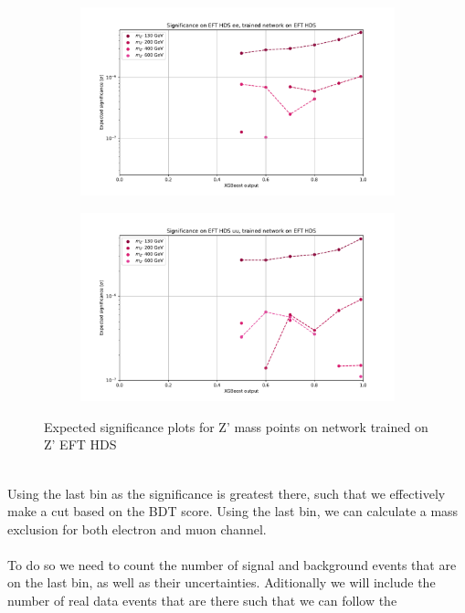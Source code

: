 \documentclass[14pt, a4paper]{book}
\begin{document}
\begin{figure}[!ht]
	\centering
	\begin{subfigure}[b]{0.49\textwidth}
      \centering
      \includegraphics[width=1\textwidth]{XGBoost/EFT_HDS/EXP_SIG_ee.pdf}
      \end{subfigure}
   \hfill
   \begin{subfigure}[b]{0.49\textwidth}
      \centering
      \includegraphics[width=1\textwidth]{XGBoost/EFT_HDS/EXP_SIG_uu.pdf}
      \end{subfigure}
   \caption{Expected significance plots for Z' mass points on network trained on Z' EFT HDS}\label{fig:EFT_HDS_exp_sig}
\end{figure}
\\Using the last bin as the significance is greatest there, such that we effectively make a cut based on the BDT score. Using the last bin, we can calculate a mass exclusion for both electron and muon channel.\\
\\To do so we need to count the number of signal and background events that are on the last bin, as well as their uncertainties. Aditionally we will include the number of real data events that are there such that we can follow the 
\end{document}
